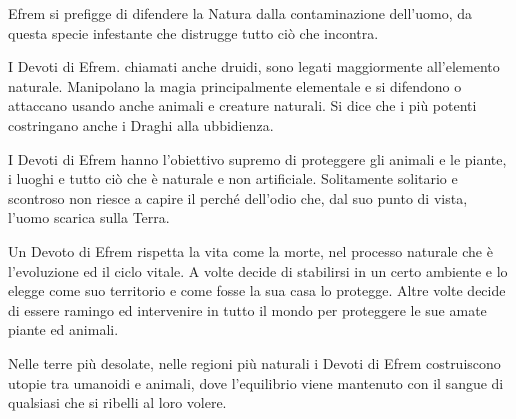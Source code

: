 \begin{multicols}{2}
Efrem si prefigge di difendere la Natura dalla contaminazione dell'uomo, da questa specie infestante che distrugge tutto ciò che incontra.

I Devoti di Efrem. chiamati anche druidi, sono legati maggiormente all'elemento naturale. Manipolano la magia principalmente elementale e si difendono o attaccano usando anche animali e creature naturali. Si dice che i più potenti costringano anche i Draghi alla ubbidienza.

I Devoti di Efrem hanno l'obiettivo supremo di proteggere gli animali e le piante, i luoghi e tutto ciò che è naturale e non artificiale. Solitamente solitario e scontroso non riesce a capire il perché dell'odio che, dal suo punto di vista, l'uomo scarica sulla Terra.

Un Devoto di Efrem rispetta la vita come la morte, nel processo naturale che è l'evoluzione ed il ciclo vitale. A volte decide di stabilirsi in un certo ambiente e lo elegge come suo territorio e come fosse la sua casa lo protegge. Altre volte decide di essere ramingo ed intervenire in tutto il mondo per proteggere le sue amate piante ed animali.

Nelle terre più desolate, nelle regioni più naturali i Devoti di Efrem costruiscono utopie tra umanoidi e animali, dove l'equilibrio viene mantenuto con il sangue di qualsiasi che si ribelli al loro volere.


\end{multicols}
